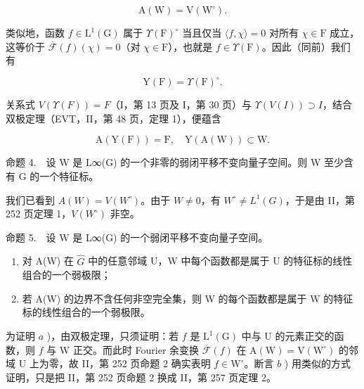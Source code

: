 \[
\mathrm{A} (\mathrm{W}) = \mathrm{V} (\mathrm{W} ^ {\circ}).
\]

类似地，函数 \(f \in \mathrm{L}^1(\mathrm{G})\) 属于 \(\Upsilon(\mathrm{F})^\circ\) 当且仅当 \(\langle f, \chi \rangle = 0\) 对所有 \(\chi \in \mathrm{F}\) 成立，这等价于 \(\overline{\mathcal{F}}(f)(\chi) = 0\)（对 \(\chi \in \mathrm{F}\)），也就是 \(f \in \Upsilon(\mathrm{F})\)。因此（同前）我们有

\[
\mathrm{Y} (\mathrm{F}) = \Upsilon (\mathrm{F}) ^ {\circ}.
\]

关系式 \(V(\Upsilon(F)) = F\)（I，第 13 页及 I，第 30 页）与 \(\Upsilon(V(I)) \supset I\)，结合双极定理（EVT，II，第 48 页，定理 1），便蕴含

\[
\mathrm{A} (\mathrm{Y} (\mathrm{F})) = \mathrm{F}, \quad \mathrm{Y} (\mathrm{A} (\mathrm{W})) \subset \mathrm{W}.
\]

命题 4.　设 W 是 L∞(G) 的一个非零的弱闭平移不变向量子空间。则 W 至少含有 G 的一个特征标。

我们已看到 \(A(W) = V(W^{\circ})\)。由于 \(W \neq 0\)，有 \(W^{\circ} \neq L^{1}(G)\)，于是由 II，第 252 页定理 1，\(V(W^{\circ})\) 非空。

命题 5.　设 W 是 L∞(G) 的一个弱闭平移不变向量子空间。

\begin{enumerate}
\def\labelenumi{\alph{enumi})}
\item
  对 A(W) 在 \(\widehat{G}\) 中的任意邻域 U，W 中每个函数都是属于 U 的特征标的线性组合的一个弱极限；
\item
  若 A(W) 的边界不含任何非空完全集，则 W 的每个函数都是属于 W 的特征标的线性组合的一个弱极限。
\end{enumerate}

为证明 \(a\) )，由双极定理，只须证明：若 \(f\) 是 \(\mathrm{L}^{1}(\mathrm{G})\) 中与 U 的元素正交的函数，则 \(f\) 与 W 正交。而此时 Fourier 余变换 \(\overline{\mathcal{F}}(f)\) 在 \(\mathrm{A}(\mathrm{W}) = \mathrm{V}(\mathrm{W}^{\circ})\) 的邻域 U 上为零，故 II，第 252 页命题 2 确实表明 \(f \in \mathrm{W}^{\circ}\)。断言 \(b\) ) 用类似的方式证明，只是把 II，第 252 页命题 2 换成 II，第 257 页定理 2。

